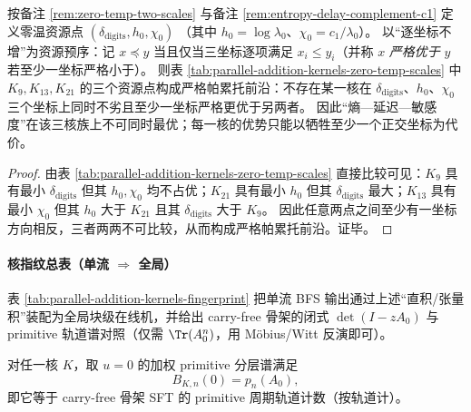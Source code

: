 

\begin{corollary}\label{cor:parallel-addition-zero-temp-pareto-frontier}
按备注 \ref{rem:zero-temp-two-scales} 与备注 \ref{rem:entropy-delay-complement-c1} 定义零温资源点
\(
(\delta_{\mathrm{digits}},h_0,\chi_0)
\)
（其中 \(h_0=\log\lambda_0\)、\(\chi_0=c_1/\lambda_0\)）。
以“逐坐标不增”为资源预序：记 \(x\preceq y\) 当且仅当三坐标逐项满足 \(x_i\le y_i\)（并称 \(x\) \emph{严格优于} \(y\) 若至少一坐标严格小于）。
则表 \ref{tab:parallel-addition-kernels-zero-temp-scales} 中 \(K_9,K_{13},K_{21}\) 的三个资源点构成严格帕累托前沿：不存在某一核在 \(\delta_{\mathrm{digits}}\)、\(h_0\)、\(\chi_0\) 三个坐标上同时不劣且至少一坐标严格更优于另两者。
因此“熵—延迟—敏感度”在该三核族上不可同时最优；每一核的优势只能以牺牲至少一个正交坐标为代价。
\end{corollary}
\begin{proof}
由表 \ref{tab:parallel-addition-kernels-zero-temp-scales} 直接比较可见：\(K_9\) 具有最小 \(\delta_{\mathrm{digits}}\) 但其 \(h_0,\chi_0\) 均不占优；\(K_{21}\) 具有最小 \(h_0\) 但其 \(\delta_{\mathrm{digits}}\) 最大；\(K_{13}\) 具有最小 \(\chi_0\) 但其 \(h_0\) 大于 \(K_{21}\) 且其 \(\delta_{\mathrm{digits}}\) 大于 \(K_9\)。
因此任意两点之间至少有一坐标方向相反，三者两两不可比较，从而构成严格帕累托前沿。证毕。
\end{proof}

\paragraph{核指纹总表（单流 $\Rightarrow$ 全局）}
表 \ref{tab:parallel-addition-kernels-fingerprint} 把单流 BFS 输出通过上述“直积/张量积”装配为全局块级在线机，并给出 carry-free 骨架的闭式 $\det(I-zA_0)$ 与 primitive 轨道谱对照（仅需 $\Tr(A_0^n)$，用 Möbius/Witt 反演即可）。


\begin{corollary}\label{cor:Bn0-equals-primitive-skeleton}
对任一核 $K$，取 $u=0$ 的加权 primitive 分层谱满足
\[
B_{K,n}(0)=p_n(A_0),
\]
即它等于 carry-free 骨架 SFT 的 primitive 周期轨道计数（按轨道计）。
\end{corollary}

